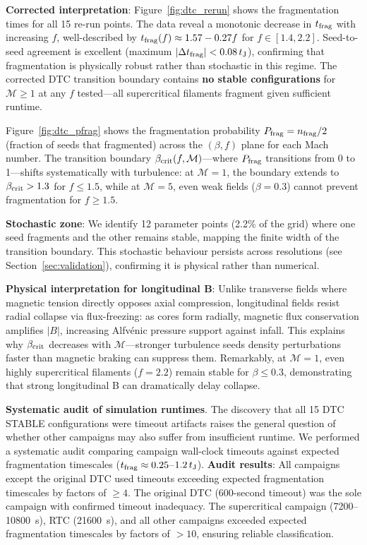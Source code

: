 \documentclass[twocolumn]{mnras}
\begin{document}
\textbf{Corrected interpretation}: Figure~\ref{fig:dtc_rerun} shows the fragmentation times for all 15 re-run points. The data reveal a monotonic decrease in $t_{\rm frag}$ with increasing $f$, well-described by $t_{\rm frag}(f) \approx 1.57 - 0.27f$ for $f \in [1.4, 2.2]$. Seed-to-seed agreement is excellent (maximum $|\Delta t_{\rm frag}| < 0.08\,t_{\rm J}$), confirming that fragmentation is physically robust rather than stochastic in this regime. The corrected DTC transition boundary contains \textbf{no stable configurations} for $\mathcal{M} \geq 1$ at any $f$ tested—all supercritical filaments fragment given sufficient runtime.

Figure~\ref{fig:dtc_pfrag} shows the fragmentation probability $P_{\rm frag} = n_{\rm frag}/2$ (fraction of seeds that fragmented) across the $(\beta, f)$ plane for each Mach number. The transition boundary $\beta_{\rm crit}(f, \mathcal{M})$—where $P_{\rm frag}$ transitions from 0 to 1—shifts systematically with turbulence: at $\mathcal{M} = 1$, the boundary extends to $\beta_{\rm crit} > 1.3$ for $f \leq 1.5$, while at $\mathcal{M} = 5$, even weak fields ($\beta = 0.3$) cannot prevent fragmentation for $f \geq 1.5$.

\textbf{Stochastic zone}: We identify 12 parameter points (2.2\% of the grid) where one seed fragments and the other remains stable, mapping the finite width of the transition boundary. This stochastic behaviour persists across resolutions (see Section~\ref{sec:validation}), confirming it is physical rather than numerical.

\textbf{Physical interpretation for longitudinal B}: Unlike transverse fields where magnetic tension directly opposes axial compression, longitudinal fields resist radial collapse via flux-freezing: as cores form radially, magnetic flux conservation amplifies $|B|$, increasing Alfv\'enic pressure support against infall. This explains why $\beta_{\rm crit}$ decreases with $\mathcal{M}$---stronger turbulence seeds density perturbations faster than magnetic braking can suppress them. Remarkably, at $\mathcal{M} = 1$, even highly supercritical filaments ($f = 2.2$) remain stable for $\beta \leq 0.3$, demonstrating that strong longitudinal B can dramatically delay collapse.

\textbf{Systematic audit of simulation runtimes}. The discovery that all 15 DTC STABLE configurations were timeout artifacts raises the general question of whether other campaigns may also suffer from insufficient runtime. We performed a systematic audit comparing campaign wall-clock timeouts against expected fragmentation timescales ($t_{\rm frag} \approx 0.25$--$1.2\,t_{\rm J}$). \textbf{Audit results}: All campaigns except the original DTC used timeouts exceeding expected fragmentation timescales by factors of $\geq 4$. The original DTC (600-second timeout) was the sole campaign with confirmed timeout inadequacy. The supercritical campaign (7200--10800~s), RTC (21600~s), and all other campaigns exceeded expected fragmentation timescales by factors of $>10$, ensuring reliable classification.
\end{document}
